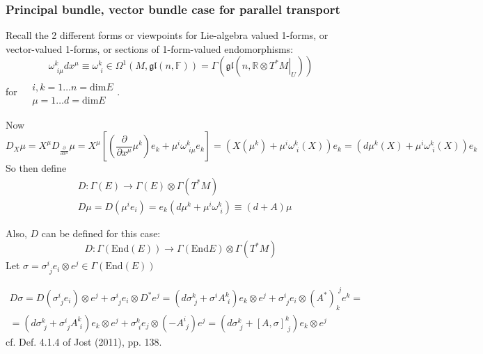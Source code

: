 \documentclass[10pt]{amsart}
\begin{document}
\begin{multicols*}{2}
\subsubsection{Principal bundle, vector bundle case for parallel transport}  

Recall the 2 different forms or viewpoints for Lie-algebra valued 1-forms, or vector-valued 1-forms, or sections of 1-form-valued endomorphisms:
\[
\omega^k_{ \,\, i\mu} dx^{\mu} \equiv \omega^k_{\,\,i} \in \Omega^1(M,\mathfrak{gl}(n,\mathbb{F})) = \Gamma(\mathfrak{gl}(n,\mathbb{R} \otimes \left. T^* M \right|_U ) )
\] 
for $\begin{aligned} & \quad \\
	& i,k = 1\dots n =\text{dim}E \\ 
	& \mu = 1\dots d =\text{dim}E \end{aligned}$.  

Now
\[
D_X\mu = X^{\mu} D_{\frac{\partial }{ \partial x^{\mu}}}\mu = X^{\mu} \left[ \left( \frac{ \partial }{ \partial x^{\mu}} \mu^k \right) e_k + \mu^i \omega^k_{ \,\, i\mu} e_k \right] = \left( X(\mu^k) + \mu^i \omega^k_{ \,\, i}(X) \right) e_k = \left( d\mu^k(X) + \mu^i \omega^k_{ \,\, i}(X) \right) e_k
\]
So then define 
\begin{equation}
	\begin{aligned}
		& D: \Gamma(E) \to \Gamma(E) \otimes \Gamma(T^*M) \\
	& D\mu  = D(\mu^i e_i) = e_k ( d\mu^k +\mu^i \omega^k_{ \,\, i}) \equiv (d+A)\mu
	\end{aligned}
\end{equation}

Also, $D$ can be defined for this case:
\[
D: \Gamma (\text{End}(E)) \to \Gamma(\text{End}E) \otimes \Gamma(T^*M)
\]
Let $\sigma = \sigma^i_{ \,\, j} e_i \otimes e^j \in \Gamma(\text{End}(E))$

\begin{equation}
\begin{gathered}
	D\sigma = D(\sigma^i_{ \,\, j} e_i ) \otimes e^j + \sigma^i_{ \,\, j} e_i \otimes D^* e^j = \left( d\sigma^k_{ \,\, j} + \sigma^i A^k_{ \,\, i} \right) e_k \otimes e^j + \sigma^i_{ \,\, j} e_i \otimes (A^*)_k^{ \,\, j} e^k = \\
	= (d\sigma^k_{ \,\, j} + \sigma^i_{ \,\, j} A^k_{ \,\, i} ) e_k \otimes e^j + \sigma^k_{ \,\, i} e_j \otimes (- A^i_{ \, \, j}) e^j = (d\sigma^k_{ \,\, j} + [A,\sigma]^k_{ \,\, j}) e_k\otimes e^j
\end{gathered}
\end{equation}
cf. Def. 4.1.4 of Jost (2011), pp. 138.  


\end{multicols*}
\end{document}
